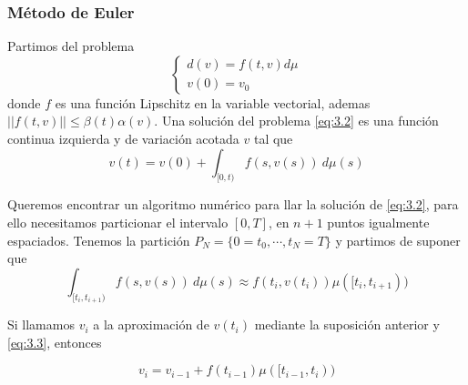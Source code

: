  \subsubsection{Método de Euler}
 Partimos del problema
 \begin{equation}
 	\left\lbrace \begin{array}{l} 
 			d(v)=f(t,v) d\mu\\
 			v(0)=v_0
 			\end{array}\right. \label{eq:3.2}
 \end{equation} 
 donde $f$ es una función Lipschitz en la variable vectorial, ademas $||f(t,v)||\leq \beta(t)\alpha(v)$. Una solución del problema \ref{eq:3.2} es una función continua izquierda y de variación acotada $v$ tal que
 \begin{equation}
 	v(t)=v(0)+\int_{[0,t)}f(s,v(s))\: d\mu(s) \label{eq:3.3}
 \end{equation}
 
 Queremos encontrar un algoritmo numérico para llar la solución de \ref{eq:3.2}, para ello necesitamos particionar el intervalo $[0,T]$, en $n+1$ puntos igualmente espaciados. Tenemos la partición $P_N=\{0=t_0,\cdots,t_N=T\}$  y partimos de suponer que 
 $$\int_{[t_i,t_{i+1})}f(s,v(s))\:d\mu(s)\approx f(t_i,v(t_i))\mu([t_i,t_{i+1}))$$
 
 Si llamamos $v_{i}$ a la aproximación de $v(t_i)$ mediante la suposición anterior  y  \ref{eq:3.3}, entonces 
 

 $$v_{i}=v_{i-1}+f(t_{i-1})\mu([t_{i-1},t_{i}))$$

